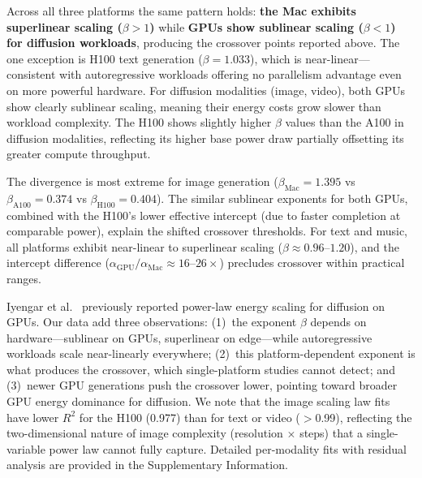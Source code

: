 \documentclass[preprint,12pt]{elsarticle}
\begin{document}
Across all three platforms the same pattern holds: \textbf{the Mac exhibits superlinear scaling ($\beta > 1$)} while \textbf{GPUs show sublinear scaling ($\beta < 1$) for diffusion workloads}, producing the crossover points reported above. The one exception is H100 text generation ($\beta = 1.033$), which is near-linear---consistent with autoregressive workloads offering no parallelism advantage even on more powerful hardware. For diffusion modalities (image, video), both GPUs show clearly sublinear scaling, meaning their energy costs grow slower than workload complexity. The H100 shows slightly higher $\beta$ values than the A100 in diffusion modalities, reflecting its higher base power draw partially offsetting its greater compute throughput.

The divergence is most extreme for image generation ($\beta_\text{Mac} = 1.395$ vs $\beta_\text{A100} = 0.374$ vs $\beta_\text{H100} = 0.404$). The similar sublinear exponents for both GPUs, combined with the H100's lower effective intercept (due to faster completion at comparable power), explain the shifted crossover thresholds. For text and music, all platforms exhibit near-linear to superlinear scaling ($\beta \approx 0.96$--$1.20$), and the intercept difference ($\alpha_\text{GPU} / \alpha_\text{Mac} \approx 16$--$26\times$) precludes crossover within practical ranges.

Iyengar et al.~\cite{castano2025energy} previously reported power-law energy scaling for diffusion on GPUs. Our data add three observations: (1)~the exponent $\beta$ depends on hardware---sublinear on GPUs, superlinear on edge---while autoregressive workloads scale near-linearly everywhere; (2)~this platform-dependent exponent is what produces the crossover, which single-platform studies cannot detect; and (3)~newer GPU generations push the crossover lower, pointing toward broader GPU energy dominance for diffusion. We note that the image scaling law fits have lower $R^2$ for the H100 (0.977) than for text or video ($>$0.99), reflecting the two-dimensional nature of image complexity (resolution $\times$ steps) that a single-variable power law cannot fully capture. Detailed per-modality fits with residual analysis are provided in the Supplementary Information.
\end{document}

